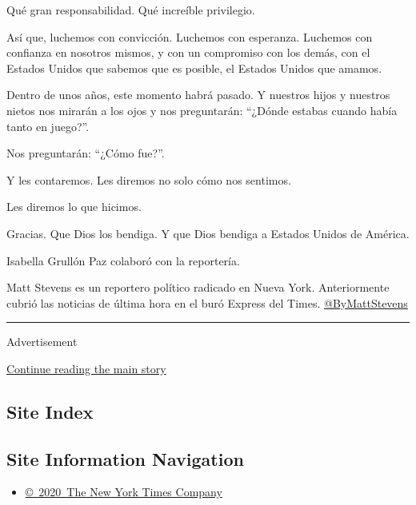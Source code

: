 Qué gran responsabilidad. Qué increíble privilegio.

Así que, luchemos con convicción. Luchemos con esperanza. Luchemos con
confianza en nosotros mismos, y con un compromiso con los demás, con el
Estados Unidos que sabemos que es posible, el Estados Unidos que amamos.

Dentro de unos años, este momento habrá pasado. Y nuestros hijos y
nuestros nietos nos mirarán a los ojos y nos preguntarán: ``¿Dónde
estabas cuando había tanto en juego?''.

Nos preguntarán: ``¿Cómo fue?''.

Y les contaremos. Les diremos no solo cómo nos sentimos.

Les diremos lo que hicimos.

Gracias. Que Dios los bendiga. Y que Dios bendiga a Estados Unidos de
América.

Isabella Grullón Paz colaboró con la reportería.

Matt Stevens es un reportero político radicado en Nueva York.
Anteriormente cubrió las noticias de última hora en el buró Express del
Times. \href{https://twitter.com/ByMattStevens}{@ByMattStevens}

\begin{center}\rule{0.5\linewidth}{\linethickness}\end{center}

Advertisement

\protect\hyperlink{after-bottom}{Continue reading the main story}

\hypertarget{site-index}{%
\subsection{Site Index}\label{site-index}}

\hypertarget{site-information-navigation}{%
\subsection{Site Information
Navigation}\label{site-information-navigation}}

\begin{itemize}
\tightlist
\item
  \href{https://help.nytimes3xbfgragh.onion/hc/en-us/articles/115014792127-Copyright-notice}{©~2020~The
  New York Times Company}
\end{itemize}

